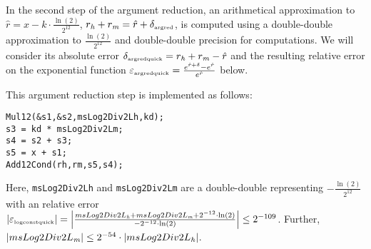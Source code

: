 In the second step of the argument reduction, an arithmetical
approximation to $\hat{r} = x - k \cdot \frac{\ln\left( 2
\right)}{2^{12}}$, $r_\hi + r_\mi = \hat{r} + \delta_{\mbox{\tiny
argred}}$, is computed using a double-double approximation to
$\frac{\ln\left( 2 \right)}{2^{12}}$ and double-double precision for
computations. We will consider its absolute error $\delta_{\mbox{\tiny
argredquick}} = r_\hi + r_\mi - \hat{r}$ and the resulting relative
error on the exponential function $\epsilon_{\mbox{\tiny argredquick}}
= \frac{e^{\hat{r} + \delta} - e^{\hat{r}}}{e^{\hat{r}}}$ below.

This argument reduction step is implemented as follows:
\begin{lstlisting}[caption={Argument reduction - second step},firstnumber=1]
Mul12(&s1,&s2,msLog2Div2Lh,kd);
s3 = kd * msLog2Div2Lm;
s4 = s2 + s3; 
s5 = x + s1;
Add12Cond(rh,rm,s5,s4);
\end{lstlisting}
Here, \texttt{msLog2Div2Lh} and \texttt{msLog2Div2Lm} are a
double-double representing $-\frac{\ln\left( 2 \right)}{2^{12}}$ with
an relative error $\left \vert \epsilon_{\mbox{\tiny logconstquick}}
\right \vert = \left \vert \frac{msLog2Div2L_\hi + msLog2Div2L_\mi +
2^{-12} \cdot \ln\left( 2 \right)}{-2^{-12} \cdot \ln\left( 2 \right)}
\right \vert \leq 2^{-109}$. Further, $\left \vert msLog2Div2L_\mi
\right \vert \leq 2^{-54} \cdot \left \vert msLog2Div2L_\hi \right
\vert$.


